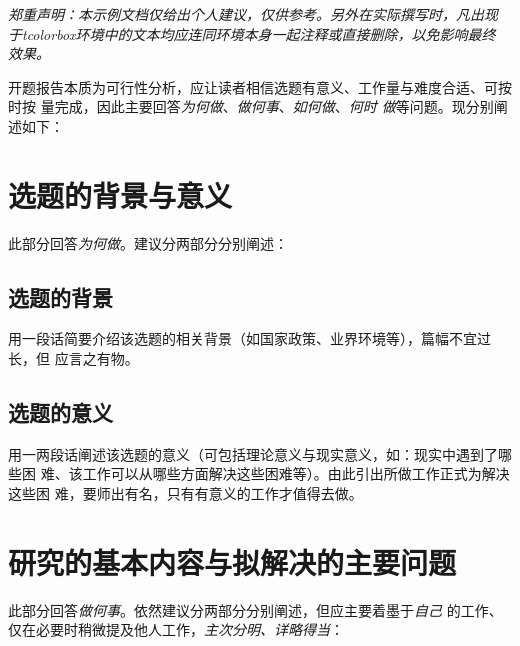 \begin{tcolorbox}
	\emph{郑重声明：本示例文档仅给出个人建议，仅供参考。另外在实际撰写时，凡出现
		于tcolorbox环境中的文本均应连同环境本身一起注释或直接删除，以免影响最终
		效果。}
\end{tcolorbox}

\begin{tcolorbox}
	开题报告本质为可行性分析，应让读者相信选题有意义、工作量与难度合适、可按时按
	量完成，因此主要回答\emph{为何做}、\emph{做何事}、\emph{如何做}、\emph{何时
		做}等问题。现分别阐述如下：
\end{tcolorbox}

\section{选题的背景与意义}

\begin{tcolorbox}
	此部分回答\emph{为何做}。建议分两部分分别阐述：
\end{tcolorbox}

\subsection{选题的背景}

\begin{tcolorbox}
	用一段话简要介绍该选题的相关背景（如国家政策、业界环境等），篇幅不宜过长，但
	应言之有物。
\end{tcolorbox}

\subsection{选题的意义}

\begin{tcolorbox}
	用一两段话阐述该选题的意义（可包括理论意义与现实意义，如：现实中遇到了哪些困
	难、该工作可以从哪些方面解决这些困难等）。由此引出所做工作正式为解决这些困
	难，要师出有名，只有有意义的工作才值得去做。
\end{tcolorbox}

\section{研究的基本内容与拟解决的主要问题}

\begin{tcolorbox}
	此部分回答\emph{做何事}。依然建议分两部分分别阐述，但应主要着墨于\emph{自己}
	的工作、仅在必要时稍微提及他人工作，\emph{主次分明、详略得当}：
\end{tcolorbox}

